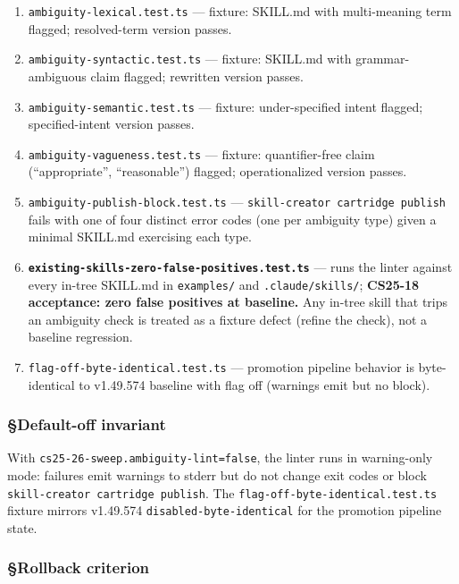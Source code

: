 \documentclass[11pt,letterpaper]{article}
\providecommand{\tightlist}{\setlength{\itemsep}{0pt}\setlength{\parskip}{0pt}}
\begin{document}
\begin{enumerate}
\def\labelenumi{\arabic{enumi}.}
\tightlist
\item
  \texttt{ambiguity-lexical.test.ts} --- fixture: SKILL.md with
  multi-meaning term flagged; resolved-term version passes.
\item
  \texttt{ambiguity-syntactic.test.ts} --- fixture: SKILL.md with
  grammar-ambiguous claim flagged; rewritten version passes.
\item
  \texttt{ambiguity-semantic.test.ts} --- fixture: under-specified
  intent flagged; specified-intent version passes.
\item
  \texttt{ambiguity-vagueness.test.ts} --- fixture: quantifier-free
  claim (``appropriate'', ``reasonable'') flagged; operationalized
  version passes.
\item
  \texttt{ambiguity-publish-block.test.ts} ---
  \texttt{skill-creator\ cartridge\ publish} fails with one of four
  distinct error codes (one per ambiguity type) given a minimal SKILL.md
  exercising each type.
\item
  \textbf{\texttt{existing-skills-zero-false-positives.test.ts}} ---
  runs the linter against every in-tree SKILL.md in \texttt{examples/}
  and \texttt{.claude/skills/}; \textbf{CS25-18 acceptance: zero false
  positives at baseline.} Any in-tree skill that trips an ambiguity
  check is treated as a fixture defect (refine the check), not a
  baseline regression.
\item
  \texttt{flag-off-byte-identical.test.ts} --- promotion pipeline
  behavior is byte-identical to v1.49.574 baseline with flag off
  (warnings emit but no block).
\end{enumerate}

\subsubsection{§Default-off invariant}

With \texttt{cs25-26-sweep.ambiguity-lint=false}, the linter runs in
warning-only mode: failures emit warnings to stderr but do not change
exit codes or block \texttt{skill-creator\ cartridge\ publish}. The
\texttt{flag-off-byte-identical.test.ts} fixture mirrors v1.49.574
\texttt{disabled-byte-identical} for the promotion pipeline state.

\subsubsection{§Rollback criterion}
\end{document}
